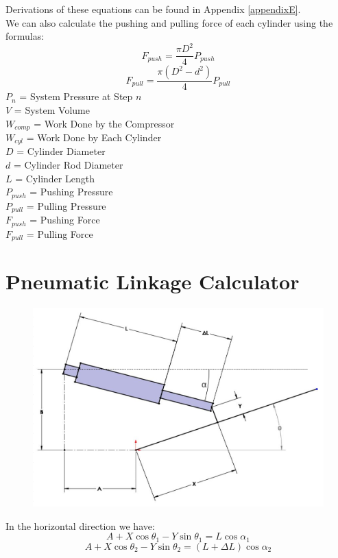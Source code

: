 \documentclass[11pt,a4paper,titlepage]{article}
\begin{document}
	Derivations of these equations can be found in Appendix \ref{appendixE}. \\
	
	We can also calculate the pushing and pulling force of each cylinder using the formulas:
	\begin{equation}
		F_{push} = \frac{\pi D^2}{4} P_{push}
	\end{equation}
	\begin{equation}
		F_{pull} = \frac{\pi (D^2 - d^2)}{4} P_{pull}
	\end{equation}
	$P_n$ = System Pressure at Step $n$\\
	$V$ = System Volume \\
	$W_{comp}$ = Work Done by the Compressor \\
	$W_{cyl}$ = Work Done by Each Cylinder \\
	$D$ = Cylinder Diameter \\
	$d$ = Cylinder Rod Diameter \\
	$L$ = Cylinder Length \\
	$P_{push}$ = Pushing Pressure \\
	$P_{pull}$ = Pulling Pressure \\
	$F_{push}$ = Pushing Force \\
	$F_{pull}$ = Pulling Force
	
	\newpage
	\section{Pneumatic Linkage Calculator}
	\begin{figure}[H]
		\centering
		\includegraphics[width=0.8\linewidth]{Pneu_Link}
	\end{figure}
	
	In the horizontal direction we have:
	\begin{equation} \label{link_x_ret}
		A + X \cos \theta_1 - Y \sin \theta_1 = L \cos \alpha_1
	\end{equation}
	\begin{equation} \label{link_x_ext}
		A + X \cos \theta_2 - Y \sin \theta_2 = (L + \Delta L) \cos \alpha_2
	\end{equation}
	
\end{document}
